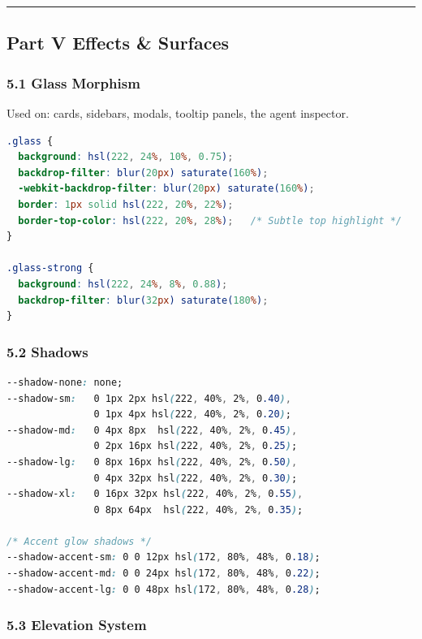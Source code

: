 \documentclass[11pt,a4paper]{article}
\begin{document}
\noindent\rule{\textwidth}{0.4pt}

\subsection*{Part V  Effects \& Surfaces}

\subsubsection*{5.1 Glass Morphism}

Used on: cards, sidebars, modals, tooltip panels, the agent inspector.

\begin{lstlisting}[language=css]
.glass {
  background: hsl(222, 24%, 10%, 0.75);
  backdrop-filter: blur(20px) saturate(160%);
  -webkit-backdrop-filter: blur(20px) saturate(160%);
  border: 1px solid hsl(222, 20%, 22%);
  border-top-color: hsl(222, 20%, 28%);   /* Subtle top highlight */
}

.glass-strong {
  background: hsl(222, 24%, 8%, 0.88);
  backdrop-filter: blur(32px) saturate(180%);
}
\end{lstlisting}

\subsubsection*{5.2 Shadows}

\begin{lstlisting}[language=css]
--shadow-none: none;
--shadow-sm:   0 1px 2px hsl(222, 40%, 2%, 0.40),
               0 1px 4px hsl(222, 40%, 2%, 0.20);
--shadow-md:   0 4px 8px  hsl(222, 40%, 2%, 0.45),
               0 2px 16px hsl(222, 40%, 2%, 0.25);
--shadow-lg:   0 8px 16px hsl(222, 40%, 2%, 0.50),
               0 4px 32px hsl(222, 40%, 2%, 0.30);
--shadow-xl:   0 16px 32px hsl(222, 40%, 2%, 0.55),
               0 8px 64px  hsl(222, 40%, 2%, 0.35);

/* Accent glow shadows */
--shadow-accent-sm: 0 0 12px hsl(172, 80%, 48%, 0.18);
--shadow-accent-md: 0 0 24px hsl(172, 80%, 48%, 0.22);
--shadow-accent-lg: 0 0 48px hsl(172, 80%, 48%, 0.28);
\end{lstlisting}

\subsubsection*{5.3 Elevation System}
\end{document}
